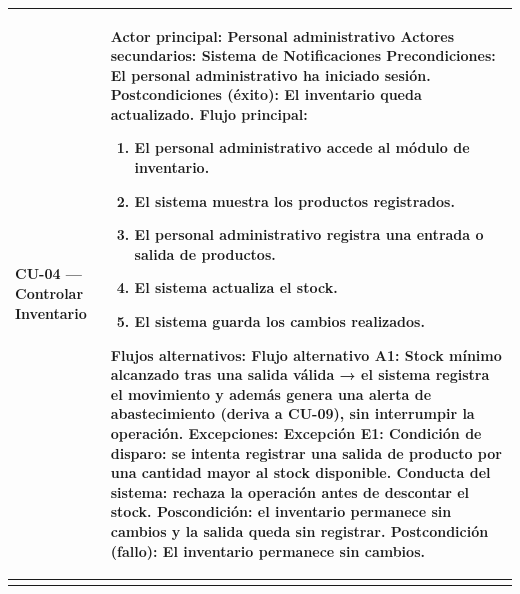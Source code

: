 \documentclass[
]{article}
\newcounter{none} %
\begin{document}
{\def\LTcaptype{none} %
\begin{longtable}[]{|
  >{\raggedright\arraybackslash}p{}|
  >{\raggedright\arraybackslash}p{}|}
\hline
\begin{minipage}[b]{\linewidth}\raggedright
\textbf{CU-04 --- Controlar Inventario}
\end{minipage} & \begin{minipage}[b]{\linewidth}\raggedright
\textbf{Actor principal:} Personal administrativo \textbf{Actores secundarios:}
Sistema de Notificaciones \textbf{Precondiciones:} El personal administrativo ha iniciado sesión. \textbf{Postcondiciones (éxito):} El inventario queda actualizado. \textbf{Flujo principal:}

\begin{enumerate}
\def\labelenumi{\arabic{enumi}.}
\item
  El personal administrativo accede al módulo de inventario.
\item
  El sistema muestra los productos registrados.
\item
  El personal administrativo registra una entrada o salida de productos.
\item
  El sistema actualiza el stock.
\item
  El sistema guarda los cambios realizados.
\end{enumerate}

\textbf{Flujos alternativos:} Flujo alternativo A1: Stock mínimo alcanzado tras una salida válida → el sistema registra el movimiento y además genera una alerta de abastecimiento (deriva a CU-09), sin interrumpir la operación.
\textbf{Excepciones:} Excepción E1: Condición de disparo: se intenta registrar una salida de producto por una cantidad mayor al stock disponible. Conducta del sistema: rechaza la operación antes de descontar el stock. Poscondición: el inventario permanece sin cambios y la salida queda sin registrar.
\textbf{Postcondición (fallo):} El inventario permanece sin cambios.
\end{minipage} \\
\hline
\endhead
\hline
\endlastfoot
\end{longtable}
}
\end{document}
